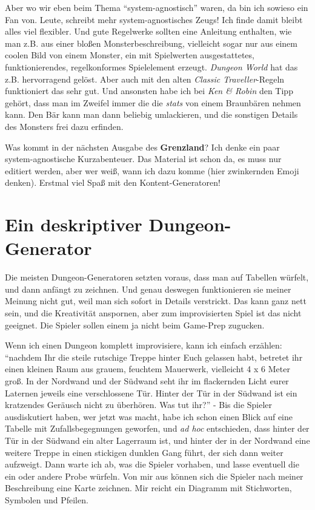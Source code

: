 Aber wo wir eben beim Thema ``system-agnostisch'' waren, 
da bin ich sowieso ein Fan von. Leute, schreibt mehr
system-agnostisches Zeugs! Ich finde damit bleibt alles viel
flexibler. Und gute Regelwerke sollten eine Anleitung enthalten, wie
man z.B. aus einer bloßen Monsterbeschreibung, vielleicht sogar nur
aus einem coolen Bild von einem Monster, ein mit Spielwerten
ausgestattetes, funktionierendes, regelkonformes Spielelement erzeugt.
\textit{Dungeon World} hat das z.B. hervorragend gelöst. Aber auch
mit den alten \textit{Classic Traveller}-Regeln funktioniert das
sehr gut. Und ansonsten habe ich bei \textit{Ken \& Robin} den Tipp
gehört, dass man im Zweifel immer die die \textit{stats} von einem
Braunbären nehmen kann. Den Bär kann man dann beliebig umlackieren,
und die sonstigen Details des
Monsters frei dazu erfinden.


Was kommt in der nächsten Ausgabe des \textbf{Grenzland}? Ich denke
ein paar system-agnostische Kurzabenteuer. Das Material ist schon
da, es muss nur editiert werden, aber wer weiß, wann ich dazu komme
(hier zwinkernden Emoji denken). Erstmal viel Spaß mit den
Kontent-Generatoren!


\section{Ein deskriptiver Dungeon-Generator}

Die meisten Dungeon-Generatoren setzten voraus, dass man auf
Tabellen würfelt, und dann anfängt zu zeichnen. Und genau deswegen
funktionieren sie meiner Meinung nicht gut, weil man sich sofort in
Details verstrickt. Das kann ganz nett sein, und die Kreativität
anspornen, aber zum improvisierten Spiel ist das nicht geeignet. Die
Spieler sollen einem ja nicht beim Game-Prep zugucken.

Wenn ich einen Dungeon komplett improvisiere, kann ich einfach
erzählen: ``nachdem Ihr die steile rutschige Treppe hinter Euch
gelassen habt,  betretet ihr einen kleinen Raum aus grauem,
feuchtem Mauerwerk, vielleicht 4 x 6 Meter groß. In der Nordwand und
der Südwand seht ihr im flackernden Licht eurer Laternen jeweils
eine verschlossene Tür.  Hinter der Tür in der Südwand ist ein
kratzendes Geräusch nicht zu überhören. Was tut ihr?'' - Bis die
Spieler 
ausdiskutiert haben, wer jetzt was macht, habe ich schon einen Blick
auf eine Tabelle mit Zufallsbegegnungen geworfen, und \textit{ad
hoc} entschieden, dass hinter der Tür in der Südwand ein alter Lagerraum ist,
und hinter der in der Nordwand eine weitere Treppe in einen
stickigen dunklen Gang führt, der sich dann weiter aufzweigt. Dann
warte ich ab, was die Spieler vorhaben, und lasse eventuell die ein
oder andere Probe würfeln. Von
mir aus können sich die Spieler nach meiner Beschreibung eine Karte
zeichnen. Mir reicht ein Diagramm mit Stichworten, Symbolen und
Pfeilen.

